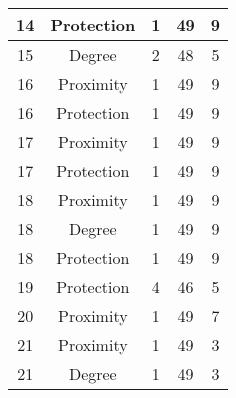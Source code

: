 \documentclass[results.tex]{subfiles}
\begin{document}
\begin{center}
\begin{tabular}{| c || c | c | c | c |}
            \hline
            14                      & Protection                   & 1                      & 49                      & 9                    \\
            \hline
            15                      & Degree                       & 2                      & 48                      & 5                    \\
            \hline
            16                      & Proximity                    & 1                      & 49                      & 9                    \\
            \hline
            16                      & Protection                   & 1                      & 49                      & 9                    \\
            \hline
            17                      & Proximity                    & 1                      & 49                      & 9                    \\
            \hline
            17                      & Protection                   & 1                      & 49                      & 9                    \\
            \hline
            18                      & Proximity                    & 1                      & 49                      & 9                    \\
            \hline
            18                      & Degree                       & 1                      & 49                      & 9                    \\
            \hline
            18                      & Protection                   & 1                      & 49                      & 9                    \\
            \hline
            19                      & Protection                   & 4                      & 46                      & 5                    \\
            \hline
            20                      & Proximity                    & 1                      & 49                      & 7                    \\
            \hline
            21                      & Proximity                    & 1                      & 49                      & 3                    \\
            \hline
            21                      & Degree                       & 1                      & 49                      & 3                    \\

\end{tabular}
\end{center}
\end{document}
